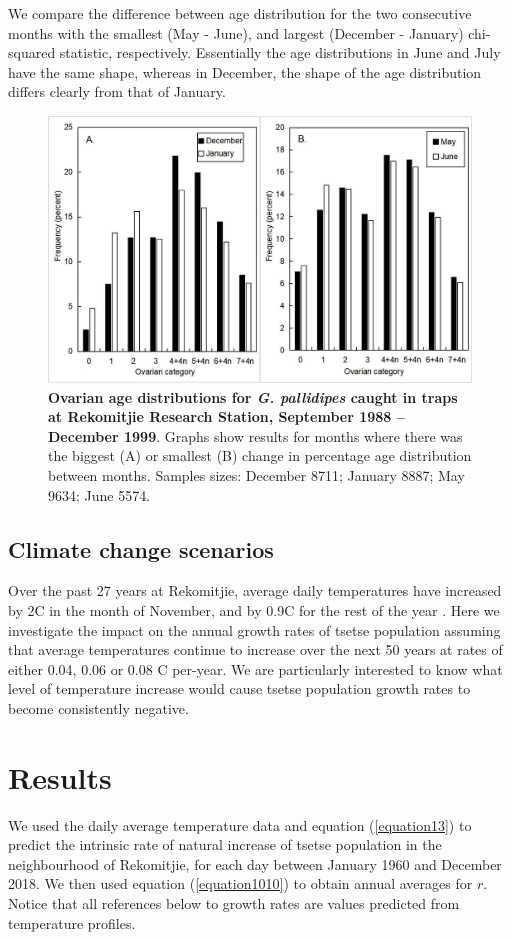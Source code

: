 \documentclass[12pt,a4paper]{article}
\begin{document}
We compare the difference between age distribution for the two consecutive months with the smallest (May - June), and largest (December - January) chi-squared statistic, respectively. Essentially the age distributions in June and July have the same shape, whereas in December, the shape of the age distribution differs clearly from that of January. 
\begin{figure}[hbt!]
	\centering
	\includegraphics[width=0.9\linewidth]{AgeDistJUNJULDECJAN}
	\caption{{\bf Ovarian age distributions for \textit{G. pallidipes} caught in traps at Rekomitjie Research Station, September 1988 – December 1999}.  Graphs show results for months where there was the biggest (A) or smallest (B) change in percentage age distribution between months. Samples sizes: December 8711; January 8887; May 9634; June 5574. }
	\label{fig:AgeDistJUNJULDECJAN}
\end{figure}




\newpage
\subsection*{Climate change scenarios}

Over the past 27 years at Rekomitjie, average daily temperatures have increased by 2\textdegree C in the month of November, and by 0.9\textdegree C for the rest of the year \cite{Lord2018}.  Here we investigate the impact on the annual growth rates of tsetse population assuming that average temperatures continue to increase over the next 50 years at rates of either 0.04, 0.06 or 0.08 \textdegree C per-year. We are particularly interested to know what level of temperature increase would cause tsetse population growth rates to become consistently negative.

\section*{Results}
We used the daily average temperature data and equation (\ref{equation13}) to predict the intrinsic rate of natural increase of tsetse population in the neighbourhood of Rekomitjie, for each day between January 1960 and December 2018. We then used equation (\ref{equation1010}) to obtain annual averages for $r$. Notice that all references below to growth rates are values predicted from temperature profiles.   
\end{document}
